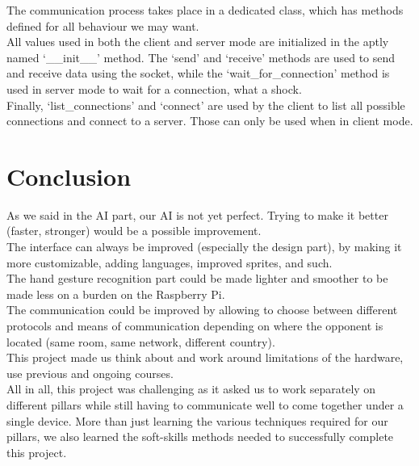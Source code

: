 \documentclass[11pt, a4paper, oneside]{report}
\begin{document}
	The communication process takes place in a dedicated class, which has methods defined for all behaviour we may want. \\
	All values used in both the client and server mode are initialized in the aptly named `\_\_init\_\_' method. The `send' and `receive' methods are used to send and receive data using the socket, while the `wait\_for\_connection' method is used in server mode to wait for a connection, what a shock. \\
	Finally, `list\_connections' and `connect' are used by the client to list all possible connections and connect to a server. Those can only be used when in client mode.
	
	\chapter{Conclusion}
	As we said in the AI part, our AI is not yet perfect. Trying to make it better (faster, stronger) would be a possible improvement. \\
	The interface can always be improved (especially the design part), by making it more customizable, adding languages, improved sprites, and such. \\
	The hand gesture recognition part could be made lighter and smoother to be made less on a burden on the Raspberry Pi. \\
	The communication could be improved by allowing to choose between different protocols and means of communication depending on where the opponent is located (same room, same network, different country). \\

	This project made us think about and work around limitations of the hardware, use previous and ongoing courses. \\
	All in all, this project was challenging as it asked us to work separately on different pillars while still having to communicate well to come together under a single device. More than just learning the various techniques required for our pillars, we also learned the soft-skills methods needed to successfully complete this project. 
\end{document}
